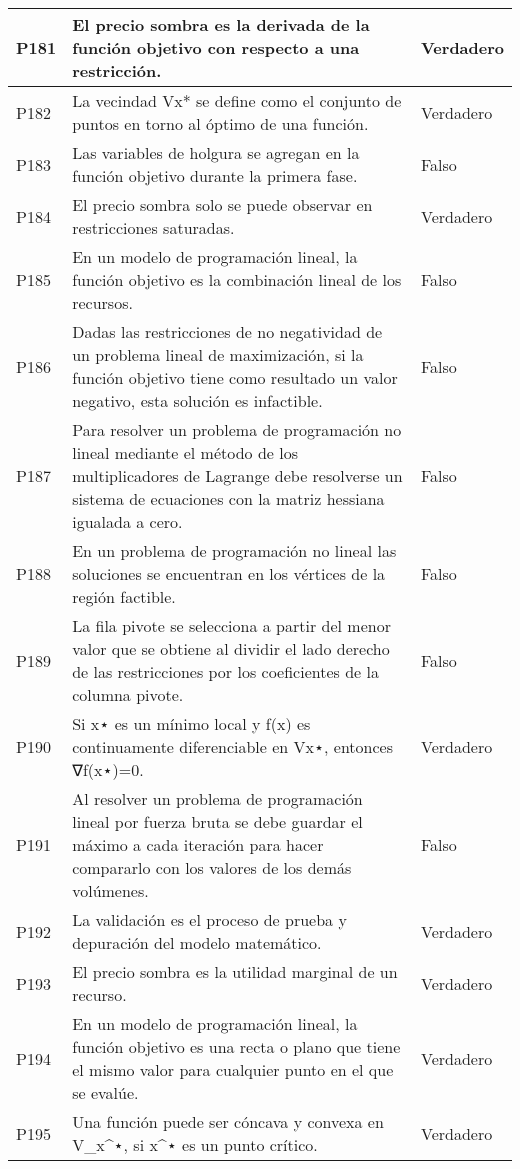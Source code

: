 \documentclass{article}
\begin{document}
\begin{longtable}{|>{\centering\arraybackslash}p{1.5cm}|>{\raggedright\arraybackslash}p{14cm}|>{\centering\arraybackslash}p{2cm}|}
\hline
P181 & El precio sombra es la derivada de la función objetivo con respecto a una restricción. & Verdadero \\
\hline
P182 & La vecindad Vx* se define como el conjunto de puntos en torno al óptimo de una función. & Verdadero \\
\hline
P183 & Las variables de holgura se agregan en la función objetivo durante la primera fase. & Falso \\
\hline
P184 & El precio sombra solo se puede observar en restricciones saturadas. & Verdadero \\
\hline
P185 & En un modelo de programación lineal, la función objetivo es la combinación lineal de los recursos. & Falso \\
\hline
P186 & Dadas las restricciones de no negatividad de un problema lineal de maximización, si la función objetivo tiene como resultado un valor negativo, esta solución es infactible. & Falso \\
\hline
P187 & Para resolver un problema de programación no lineal mediante el método de los multiplicadores de Lagrange debe resolverse un sistema de ecuaciones con la matriz hessiana igualada a cero. & Falso \\
\hline
P188 & En un problema de programación no lineal las soluciones se encuentran en los vértices de la región factible. & Falso \\
\hline
P189 & La fila pivote se selecciona a partir del menor valor que se obtiene al dividir el lado derecho de las restricciones por los coeficientes de la columna pivote. & Falso \\
\hline
P190 & Si x⋆ es un mínimo local y f(x) es continuamente diferenciable en Vx⋆, entonces ∇f(x⋆)=0. & Verdadero \\
\hline
P191 & Al resolver un problema de programación lineal por fuerza bruta se debe guardar el máximo a cada iteración para hacer compararlo con los valores de los demás volúmenes. & Falso \\
\hline
P192 & La validación es el proceso de prueba y depuración del modelo matemático. & Verdadero \\
\hline
P193 & El precio sombra es la utilidad marginal de un recurso. & Verdadero \\
\hline
P194 & En un modelo de programación lineal, la función objetivo es una recta o plano que tiene el mismo valor para cualquier punto en el que se evalúe. & Verdadero \\
\hline
P195 & Una función puede ser cóncava y convexa en V\_x\^{}⋆, si x\^{}⋆ es un punto crítico. & Verdadero \\

\end{longtable}
\end{document}
